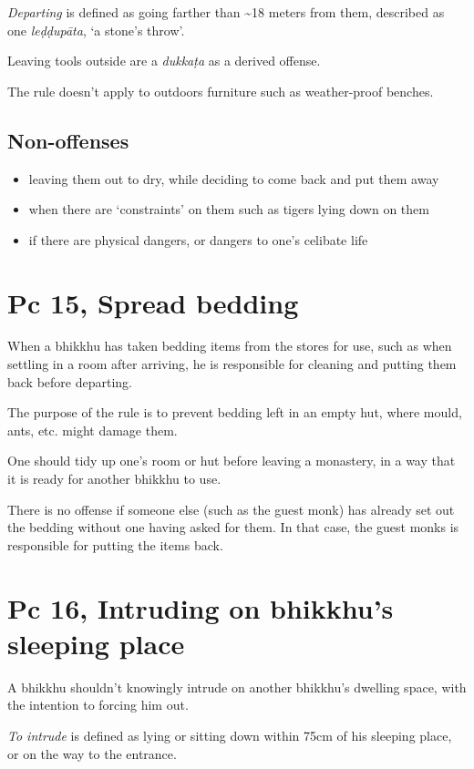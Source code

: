 \emph{Departing} is defined as going farther than \textasciitilde18
meters from them, described as one \emph{leḍḍupāta}, `a stone's throw'.

Leaving tools outside are a \emph{dukkaṭa} as a derived offense.

The rule doesn't apply to outdoors furniture such as weather-proof
benches.

\subsection{Non-offenses}

\begin{itemize}
\tightlist
\item
  leaving them out to dry, while deciding to come back and put them away
\item
  when there are `constraints' on them such as tigers lying down on them
\item
  if there are physical dangers, or dangers to one's celibate life
\end{itemize}

\section{Pc 15, Spread bedding}

When a bhikkhu has taken bedding items from the stores for use, such as
when settling in a room after arriving, he is responsible for cleaning
and putting them back before departing.

The purpose of the rule is to prevent bedding left in an empty hut,
where mould, ants, etc. might damage them.

One should tidy up one's room or hut before leaving a monastery, in a
way that it is ready for another bhikkhu to use.

There is no offense if someone else (such as the guest monk) has already
set out the bedding without one having asked for them. In that case, the
guest monks is responsible for putting the items back.

\section{Pc 16, Intruding on bhikkhu's sleeping place}

A bhikkhu shouldn't knowingly intrude on another bhikkhu's dwelling
space, with the intention to forcing him out.

\emph{To intrude} is defined as lying or sitting down within 75cm of his
sleeping place, or on the way to the entrance.

